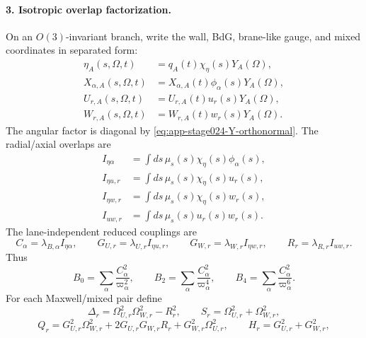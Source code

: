 \paragraph{3. Isotropic overlap factorization.}
On an \(O(3)\)-invariant branch, write the wall, BdG, brane-like gauge, and mixed coordinates in separated form:
\begin{align}
\eta_A(s,\Omega,t)&=q_A(t)\chi_\eta(s)Y_A(\Omega),\label{eq:app-stage024-eta-sep}\\
X_{\alpha,A}(s,\Omega,t)&=X_{\alpha,A}(t)\phi_\alpha(s)Y_A(\Omega),\label{eq:app-stage024-X-sep}\\
U_{r,A}(s,\Omega,t)&=U_{r,A}(t)u_r(s)Y_A(\Omega),\label{eq:app-stage024-U-sep}\\
W_{r,A}(s,\Omega,t)&=W_{r,A}(t)w_r(s)Y_A(\Omega).\label{eq:app-stage024-W-sep}
\end{align}
The angular factor is diagonal by \eqref{eq:app-stage024-Y-orthonormal}.  The radial/axial overlaps are
\begin{align}
I_{\eta\alpha}&=\int ds\,\mu_s(s)\chi_\eta(s)\phi_\alpha(s),\label{eq:app-stage024-I-eta-alpha}\\
I_{\eta u,r}&=\int ds\,\mu_s(s)\chi_\eta(s)u_r(s),\label{eq:app-stage024-I-eta-u}\\
I_{\eta w,r}&=\int ds\,\mu_s(s)\chi_\eta(s)w_r(s),\label{eq:app-stage024-I-eta-w}\\
I_{uw,r}&=\int ds\,\mu_s(s)u_r(s)w_r(s).\label{eq:app-stage024-I-uw}
\end{align}
The lane-independent reduced couplings are
\begin{equation}
\label{eq:app-stage024-isotropic-couplings}
\boxed{
C_\alpha=\lambda_{B,\alpha}I_{\eta\alpha},
\qquad
G_{U,r}=\lambda_{U,r}I_{\eta u,r},
\qquad
G_{W,r}=\lambda_{W,r}I_{\eta w,r},
\qquad
R_r=\lambda_{R,r}I_{uw,r}}.
\end{equation}
Thus
\begin{equation}
\label{eq:app-stage024-B-moments}
\boxed{
B_0=\sum_\alpha\frac{C_\alpha^2}{\varpi_\alpha^2},
\qquad
B_2=\sum_\alpha\frac{C_\alpha^2}{\varpi_\alpha^4},
\qquad
B_4=\sum_\alpha\frac{C_\alpha^2}{\varpi_\alpha^6}}.
\end{equation}
For each Maxwell/mixed pair define
\begin{equation}
\label{eq:app-stage024-Delta-S-Q-H-P}
\Delta_r=\Omega_{U,r}^2\Omega_{W,r}^2-R_r^2,
\qquad
S_r=\Omega_{U,r}^2+\Omega_{W,r}^2,
\end{equation}
\begin{equation}
Q_r=G_{U,r}^2\Omega_{W,r}^2+2G_{U,r}G_{W,r}R_r+G_{W,r}^2\Omega_{U,r}^2,
\qquad
H_r=G_{U,r}^2+G_{W,r}^2,
\end{equation}
